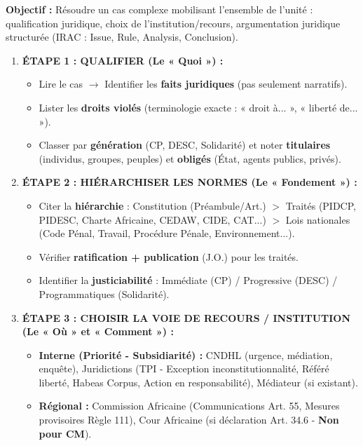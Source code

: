 \documentclass[11pt]{article}
\begin{document}
\begin{methode}
    \textbf{Objectif :} Résoudre un cas complexe mobilisant l'ensemble de l'unité : qualification juridique, choix de l'institution/recours, argumentation juridique structurée (IRAC : Issue, Rule, Analysis, Conclusion).
    \begin{enumerate}
        \item \textbf{ÉTAPE 1 : QUALIFIER (Le « Quoi ») :}
            \begin{itemize}
                \item Lire le cas $\rightarrow$ Identifier les \textbf{faits juridiques} (pas seulement narratifs).
                \item Lister les \textbf{droits violés} (terminologie exacte : « droit à... », « liberté de... »).
                \item Classer par \textbf{génération} (CP, DESC, Solidarité) et noter \textbf{titulaires} (individus, groupes, peuples) et \textbf{obligés} (État, agents publics, privés).
            \end{itemize}
        \item \textbf{ÉTAPE 2 : HIÉRARCHISER LES NORMES (Le « Fondement ») :}
            \begin{itemize}
                \item Citer la \textbf{hiérarchie} : Constitution (Préambule/Art.) $>$ Traités (PIDCP, PIDESC, Charte Africaine, CEDAW, CIDE, CAT...) $>$ Lois nationales (Code Pénal, Travail, Procédure Pénale, Environnement...).
                \item Vérifier \textbf{ratification + publication} (J.O.) pour les traités.
                \item Identifier la \textbf{justiciabilité} : Immédiate (CP) / Progressive (DESC) / Programmatiques (Solidarité).
            \end{itemize}
        \item \textbf{ÉTAPE 3 : CHOISIR LA VOIE DE RECOURS / INSTITUTION (Le « Où » et « Comment ») :}
            \begin{itemize}
                \item \textbf{Interne (Priorité - Subsidiarité) :} CNDHL (urgence, médiation, enquête), Juridictions (TPI - Exception inconstitutionnalité, Référé liberté, Habeas Corpus, Action en responsabilité), Médiateur (si existant).
                \item \textbf{Régional :} Commission Africaine (Communications Art. 55, Mesures provisoires Règle 111), Cour Africaine (si déclaration Art. 34.6 - \textbf{Non pour CM}).

\end{itemize}
\end{enumerate}
\end{methode}
\end{document}
